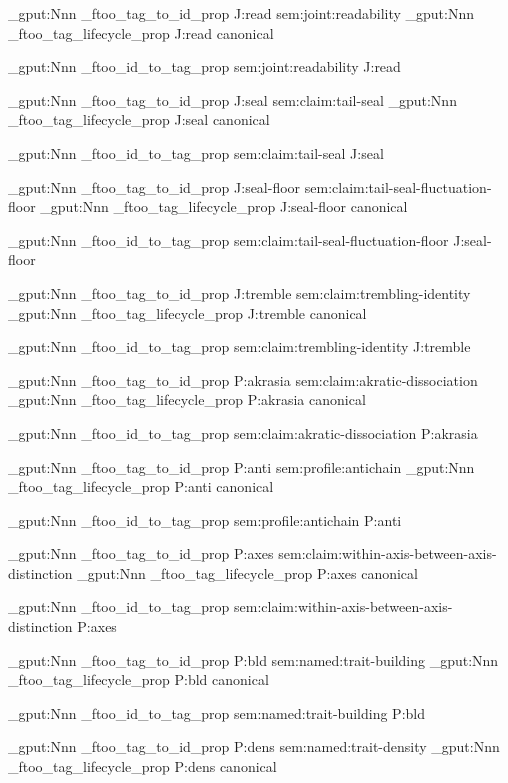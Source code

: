 \prop_gput:Nnn \g_ftoo_tag_to_id_prop { J:read } { sem:joint:readability }
\prop_gput:Nnn \g_ftoo_tag_lifecycle_prop { J:read } { canonical }

\prop_gput:Nnn \g_ftoo_id_to_tag_prop { sem:joint:readability } { J:read }


\prop_gput:Nnn \g_ftoo_tag_to_id_prop { J:seal } { sem:claim:tail-seal }
\prop_gput:Nnn \g_ftoo_tag_lifecycle_prop { J:seal } { canonical }

\prop_gput:Nnn \g_ftoo_id_to_tag_prop { sem:claim:tail-seal } { J:seal }


\prop_gput:Nnn \g_ftoo_tag_to_id_prop { J:seal-floor } { sem:claim:tail-seal-fluctuation-floor }
\prop_gput:Nnn \g_ftoo_tag_lifecycle_prop { J:seal-floor } { canonical }

\prop_gput:Nnn \g_ftoo_id_to_tag_prop { sem:claim:tail-seal-fluctuation-floor } { J:seal-floor }


\prop_gput:Nnn \g_ftoo_tag_to_id_prop { J:tremble } { sem:claim:trembling-identity }
\prop_gput:Nnn \g_ftoo_tag_lifecycle_prop { J:tremble } { canonical }

\prop_gput:Nnn \g_ftoo_id_to_tag_prop { sem:claim:trembling-identity } { J:tremble }


\prop_gput:Nnn \g_ftoo_tag_to_id_prop { P:akrasia } { sem:claim:akratic-dissociation }
\prop_gput:Nnn \g_ftoo_tag_lifecycle_prop { P:akrasia } { canonical }

\prop_gput:Nnn \g_ftoo_id_to_tag_prop { sem:claim:akratic-dissociation } { P:akrasia }


\prop_gput:Nnn \g_ftoo_tag_to_id_prop { P:anti } { sem:profile:antichain }
\prop_gput:Nnn \g_ftoo_tag_lifecycle_prop { P:anti } { canonical }

\prop_gput:Nnn \g_ftoo_id_to_tag_prop { sem:profile:antichain } { P:anti }


\prop_gput:Nnn \g_ftoo_tag_to_id_prop { P:axes } { sem:claim:within-axis-between-axis-distinction }
\prop_gput:Nnn \g_ftoo_tag_lifecycle_prop { P:axes } { canonical }

\prop_gput:Nnn \g_ftoo_id_to_tag_prop { sem:claim:within-axis-between-axis-distinction } { P:axes }


\prop_gput:Nnn \g_ftoo_tag_to_id_prop { P:bld } { sem:named:trait-building }
\prop_gput:Nnn \g_ftoo_tag_lifecycle_prop { P:bld } { canonical }

\prop_gput:Nnn \g_ftoo_id_to_tag_prop { sem:named:trait-building } { P:bld }


\prop_gput:Nnn \g_ftoo_tag_to_id_prop { P:dens } { sem:named:trait-density }
\prop_gput:Nnn \g_ftoo_tag_lifecycle_prop { P:dens } { canonical }


